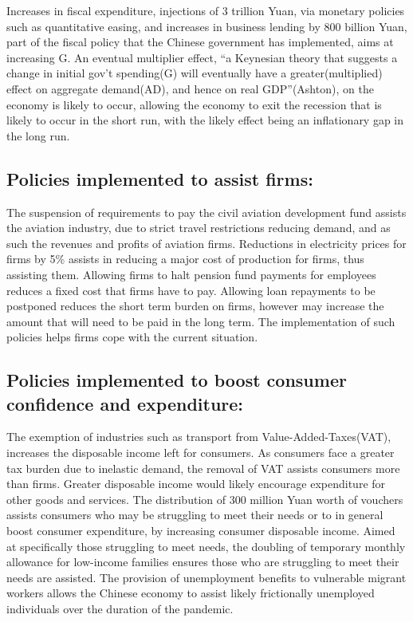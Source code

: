 \documentclass[11pt, a4paper]{article}
\begin{document}
            Increases in fiscal expenditure, injections of 3 trillion Yuan, via monetary policies such as quantitative easing, and increases in business lending by 800 billion Yuan, part of the fiscal policy that the Chinese government has implemented, aims at increasing G. An eventual multiplier effect, ``a Keynesian theory that suggests a change in initial gov’t spending(G) will eventually have a greater(multiplied) effect on aggregate demand(AD), and hence on real GDP''(Ashton), on the economy is likely to occur, allowing the economy to exit the recession that is likely to occur in the short run, with the likely effect being an inflationary gap in the long run.
        \subsection{Policies implemented to assist firms:}
            The suspension of requirements to pay the civil aviation development fund assists the aviation industry, due to strict travel restrictions reducing demand, and as such the revenues and profits of aviation firms. Reductions in electricity prices for firms by 5\% assists in reducing a major cost of production for firms, thus assisting them. Allowing firms to halt pension fund payments for employees reduces a fixed cost that firms have to pay. Allowing loan repayments to be postponed reduces the short term burden on firms, however may increase the amount that will need to be paid in the long term. The implementation of such policies helps firms cope with the current situation.
        \subsection{Policies implemented to boost consumer confidence and expenditure:}
            The exemption of industries such as transport from Value-Added-Taxes(VAT), increases the disposable income left for consumers. As consumers face a greater tax burden due to inelastic demand, the removal of VAT assists consumers more than firms. Greater disposable income would likely encourage expenditure for other goods and services. The distribution of 300 million Yuan worth of vouchers assists consumers who may be struggling to meet their needs or to in general boost consumer expenditure, by increasing consumer disposable income. Aimed at specifically those struggling to meet needs, the doubling of temporary monthly allowance for low-income families ensures those who are struggling to meet their needs are assisted. The provision of unemployment benefits to vulnerable migrant workers allows the Chinese economy to assist likely frictionally unemployed individuals over the duration of the pandemic.
\end{document}
